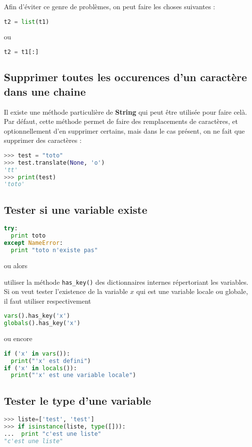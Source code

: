 \documentclass[a4paper,twoside]{article}
\begin{document}
Afin d'éviter ce genre de problèmes, on peut faire les choses suivantes :
\begin{lstlisting}[language=python]
t2 = list(t1)
\end{lstlisting}
ou
\begin{lstlisting}[language=python]
t2 = t1[:]
\end{lstlisting}

\subsection{Supprimer toutes les occurences d'un caractère dans une chaine}
Il existe une méthode particulière de \textbf{String} qui peut être utilisée pour faire celà. Par défaut, cette méthode permet de faire des remplacements de caractères, et optionnellement d'en supprimer certains, mais dans le cas présent, on ne fait que supprimer des caractères : 
\begin{lstlisting}[language=python]
>>> test = "toto"
>>> test.translate(None, 'o')
'tt'
>>> print(test)
'toto'
\end{lstlisting}

\subsection{Tester si une variable existe}
\begin{lstlisting}[language=python]
try:
  print toto
except NameError:
  print "toto n'existe pas"
\end{lstlisting}

ou alors

utiliser la méthode \texttt{has\_key()} des dictionnaires internes répertoriant les variables. Si on veut tester l'existence de la variable $x$  qui est une variable locale ou globale, il faut utiliser respectivement
\begin{lstlisting}[language=python]
vars().has_key('x')
globals().has_key('x')
\end{lstlisting}

ou encore
\begin{lstlisting}[language=python]
if ('x' in vars()):
  print("'x' est defini")
if ('x' in locals()):
  print("'x' est une variable locale")
\end{lstlisting}


\subsection{Tester le type d'une variable}
\begin{lstlisting}[language=python]
>>> liste=['test', 'test']
>>> if isinstance(liste, type([])):
...  print "c'est une liste"
"c'est une liste"
\end{lstlisting}
\end{document}
